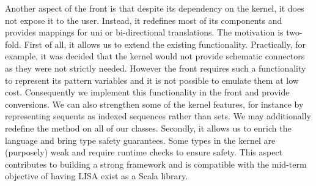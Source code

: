 Another aspect of the front is that despite its dependency on the kernel, it does not expose it to the user. Instead, it redefines most of its components and provides mappings for uni or bi-directional translations. The motivation is two-fold. First of all, it allows us to extend the existing functionality. Practically, for example, it was decided that the kernel would not provide schematic connectors as they were not strictly needed. However the front requires such a functionality to represent its pattern variables and it is not possible to emulate them at low cost. Consequently we implement this functionality in the front and provide conversions. We can also strengthen some of the kernel features, for instance by representing sequents as indexed sequences rather than sets. We may additionally redefine the method  on all of our classes. Secondly, it allows us to enrich the language and bring type safety guarantees. Some types in the kernel are (purposely) weak and require runtime checks to ensure safety. This aspect contributes to building a strong framework and is compatible with the mid-term objective of having LISA exist as a Scala library.

